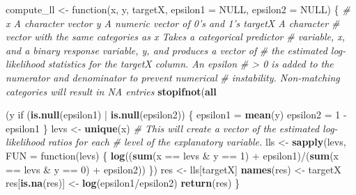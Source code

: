 \documentclass[10pt]{report}
\newenvironment{Shaded}{}{}
\newcommand{\KeywordTok}[1]{\textcolor[rgb]{0.00,0.44,0.13}{\textbf{{#1}}}}
\newcommand{\DataTypeTok}[1]{\textcolor[rgb]{0.56,0.13,0.00}{{#1}}}
\newcommand{\DecValTok}[1]{\textcolor[rgb]{0.25,0.63,0.44}{{#1}}}
\newcommand{\StringTok}[1]{\textcolor[rgb]{0.25,0.44,0.63}{{#1}}}
\newcommand{\CommentTok}[1]{\textcolor[rgb]{0.38,0.63,0.69}{\textit{{#1}}}}
\newcommand{\OtherTok}[1]{\textcolor[rgb]{0.00,0.44,0.13}{{#1}}}
\newcommand{\NormalTok}[1]{{#1}}
\begin{document}
\begin{Shaded}
\begin{Highlighting}[]
\NormalTok{compute_ll <-}\StringTok{ }\NormalTok{function(x, y, targetX, }\DataTypeTok{epsilon1 =} \OtherTok{NULL}\NormalTok{, }\DataTypeTok{epsilon2 =} \OtherTok{NULL}\NormalTok{) \{}
    \CommentTok{# x A character vector y A numeric vector of 0's and 1's targetX A character}
    \CommentTok{# vector with the same categories as x Takes a categorical predictor}
    \CommentTok{# variable, x, and a binary response variable, y, and produces a vector of}
    \CommentTok{# the estimated log-likelihood statistics for the targetX column. An epsilon}
    \CommentTok{# > 0 is added to the numerator and denominator to prevent numerical}
    \CommentTok{# instability.  Non-matching categories will result in NA entries}
    \KeywordTok{stopifnot}\NormalTok{(}\KeywordTok{all}\NormalTok{(y %in%}\StringTok{ }\KeywordTok{c}\NormalTok{(}\DecValTok{0}\NormalTok{, }\DecValTok{1}\NormalTok{)))  }\CommentTok{# response has to be binary}
    \NormalTok{if (}\KeywordTok{is.null}\NormalTok{(epsilon1) |}\StringTok{ }\KeywordTok{is.null}\NormalTok{(epsilon2)) \{}
        \NormalTok{epsilon1 =}\StringTok{ }\KeywordTok{mean}\NormalTok{(y)}
        \NormalTok{epsilon2 =}\StringTok{ }\DecValTok{1} \NormalTok{-}\StringTok{ }\NormalTok{epsilon1}
    \NormalTok{\}}
    \NormalTok{levs <-}\StringTok{ }\KeywordTok{unique}\NormalTok{(x)}
    \CommentTok{# This will create a vector of the estimated log-likelihood ratios for each}
    \CommentTok{# level of the explanatory variable.}
    \NormalTok{lls <-}\StringTok{ }\KeywordTok{sapply}\NormalTok{(levs, }\DataTypeTok{FUN =} \NormalTok{function(levs) \{}
        \KeywordTok{log}\NormalTok{((}\KeywordTok{sum}\NormalTok{(x ==}\StringTok{ }\NormalTok{levs &}\StringTok{ }\NormalTok{y ==}\StringTok{ }\DecValTok{1}\NormalTok{) +}\StringTok{ }\NormalTok{epsilon1)/(}\KeywordTok{sum}\NormalTok{(x ==}\StringTok{ }\NormalTok{levs &}\StringTok{ }\NormalTok{y ==}\StringTok{ }\DecValTok{0}\NormalTok{) +}\StringTok{ }
\StringTok{            }\NormalTok{epsilon2))}
    \NormalTok{\})}
    \NormalTok{res <-}\StringTok{ }\NormalTok{lls[targetX]}
    \KeywordTok{names}\NormalTok{(res) <-}\StringTok{ }\NormalTok{targetX}
    \NormalTok{res[}\KeywordTok{is.na}\NormalTok{(res)] <-}\StringTok{ }\KeywordTok{log}\NormalTok{(epsilon1/epsilon2)}
    \KeywordTok{return}\NormalTok{(res)}
\NormalTok{\}}

}
\end{Highlighting}
\end{Shaded}
\end{document}
